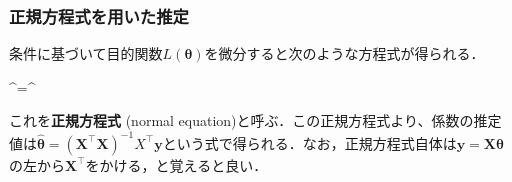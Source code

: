 \subsubsection{正規方程式を用いた推定}
条件に基づいて目的関数$L(\mathbf{\theta})$を微分すると次のような方程式が得られる．


^\top{}\mathbf{\hat\theta}=^\top{}


これを\textbf{正規方程式} (normal equation)と呼ぶ．この正規方程式より、係数の推定値は$\mathbf{\hat\theta}={(\mathbf{X}^\top\mathbf{X})}^{-1}X^\top\mathbf{y}$という式で得られる．なお，正規方程式自体は$\mathbf{y}=\mathbf{X}\mathbf{\theta}$の左から$\mathbf{X}^\top$をかける，と覚えると良い．

